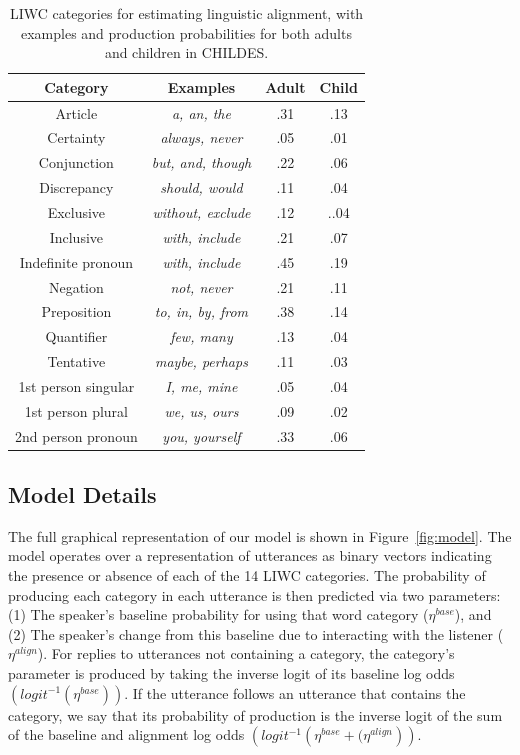 \documentclass[10pt,letterpaper]{article}
\begin{document}
\begin{table}[tb]
\centering
\begin{tabular}{|c|c|c|c|} \hline
Category & Examples & Adult & Child\\ \hline
Article & \textit{a, an, the} & .31 & .13 \\
Certainty  & \textit{always, never} & .05 & .01 \\
Conjunction  & \textit{but, and, though} & .22 & .06\\
Discrepancy  & \textit{should, would} & .11 & .04 \\
Exclusive  & \textit{without, exclude} & .12 & ..04\\
Inclusive  & \textit{with, include} & .21 & .07\\
Indefinite pronoun & \textit{with, include} & .45 & .19\\
Negation   & \textit{not, never} & .21 & .11\\
Preposition& \textit{to, in, by, from}  & .38 & .14\\
Quantifier   & \textit{few, many} & .13 & .04\\
Tentative & \textit{maybe, perhaps} & .11 & .03\\
1st person singular  & \textit{I, me, mine} & .05 & .04\\
1st person plural & \textit{we, us, ours} & .09 & .02\\
2nd person pronoun   & \textit{you, yourself} & .33 & .06\\
\hline
\end{tabular}
\caption{LIWC categories for estimating linguistic alignment, with examples and production probabilities for both adults and children in CHILDES.}\label{tab:LIWC}
\end{table}


\subsection{Model Details}

The full graphical representation of our model is shown in Figure~\ref{fig:model}. The model operates over a representation of utterances as binary vectors indicating the presence or absence of each of the 14 LIWC categories. The probability of producing each category in each utterance is then predicted via two parameters: (1) The speaker's baseline probability for using that word category ($\eta^{base}$), and (2) The speaker's change from this baseline due to interacting with the listener ($\eta^{align}$). For replies to utterances not containing a category, the category's parameter is produced by taking the inverse logit of its baseline log odds $\left(logit^{-1}\left(\eta^{base}\right)\right)$. If the utterance follows an utterance that contains the category, we say that its probability of production is the inverse logit of the sum of the baseline and alignment log odds $\left(logit^{-1}\left(\eta^{base} + (\eta^{align}\right)\right)$.
\end{document}
